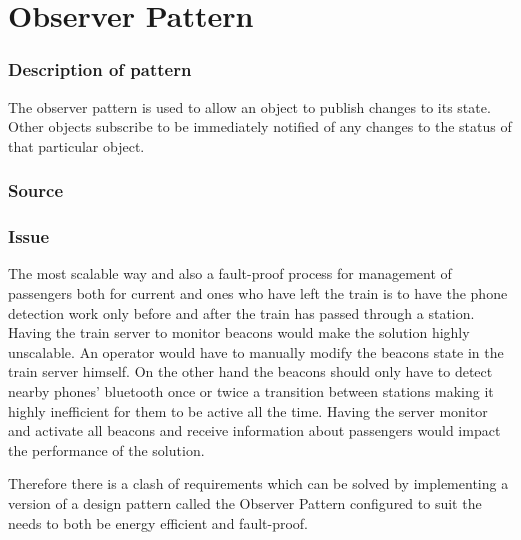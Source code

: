 
\section{Observer Pattern}

\subsubsection{Description of pattern}

	The observer pattern is used to allow an object to publish changes to its state. Other objects subscribe to be immediately notified of any changes to the status of that particular object. 

	
\iffalse
	USAGE : The main server will observe the state of train and Activate the beacons when train leaves a station . We don't need to have the beacons active when at a station 
beacons observe when phones are in range for establishing connections
\fi


\subsubsection{Source} \cite{book:design-patterns}

\subsubsection{Issue} \label{observerP:issue}
	The most scalable way and also a fault-proof process for management of passengers both for current and ones who have left the train is to have the phone detection work only before and after the train has passed through a station. Having the train server to monitor beacons would make the solution highly unscalable. An operator would have to manually modify the beacons state in the train server himself. On the other hand the beacons should only have to detect nearby phones' bluetooth once or twice a transition between stations making it highly inefficient for them to be active all the time. Having the server monitor and activate all beacons and receive information about passengers would impact the performance of the solution. 

\iffalse

	Therefore there is a clash of requirements which can be solved by implementing a version of a design pattern called the Observer Pattern configured to suit the needs to both be energy efficient and fault-proof. 

